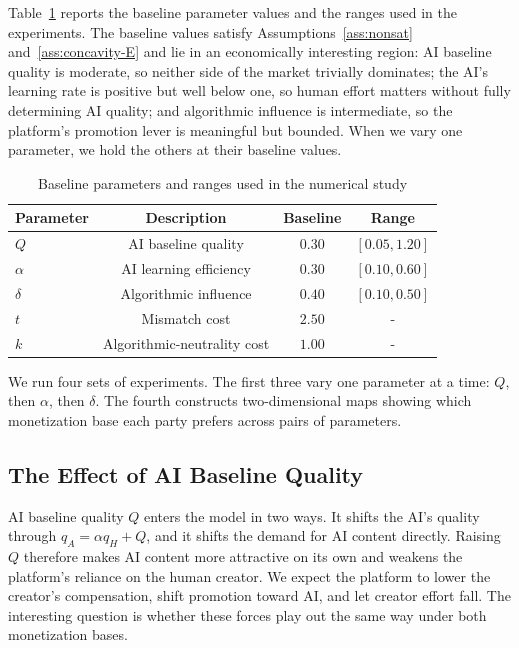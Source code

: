 Table~\ref{tab:baseline-parameters} reports the baseline parameter
values and the ranges used in the experiments. The baseline values
satisfy Assumptions~\ref{ass:nonsat} and~\ref{ass:concavity-E} and lie
in an economically interesting region: AI baseline quality is
moderate, so neither side of the market trivially dominates; the AI's
learning rate is positive but well below one, so human effort matters
without fully determining AI quality; and algorithmic influence is
intermediate, so the platform's promotion lever is meaningful but
bounded. When we vary one parameter, we hold the others at their
baseline values.

\begin{table}[ht]
\centering
\caption{Baseline parameters and ranges used in the numerical study}
\label{tab:baseline-parameters}
\begin{tabular}{lccc}
\toprule
Parameter & Description & Baseline & Range \\
\midrule
$Q$      & AI baseline quality           & $0.30$ & $[0.05,1.20]$ \\
$\alpha$ & AI learning efficiency        & $0.30$ & $[0.10,0.60]$ \\
$\delta$ & Algorithmic influence         & $0.40$ & $[0.10,0.50]$ \\
$t$      & Mismatch cost                 & $2.50$ & - \\
$k$      & Algorithmic-neutrality cost   & $1.00$ & - \\
\bottomrule
\end{tabular}
\end{table}

We run four sets of experiments. The first three vary one parameter
at a time: $Q$, then $\alpha$, then $\delta$. The fourth constructs
two-dimensional maps showing which monetization base each party
prefers across pairs of parameters.

\subsection{The Effect of AI Baseline Quality}
\label{subsec:numerics-Q}

AI baseline quality $Q$ enters the model in two ways. It shifts the
AI's quality through $q_A=\alpha q_H+Q$, and it shifts the demand for
AI content directly. Raising $Q$ therefore makes AI content more
attractive on its own and weakens the platform's reliance on the human
creator. We expect the platform to lower the creator's compensation,
shift promotion toward AI, and let creator effort fall. The
interesting question is whether these forces play out the same way
under both monetization bases.

